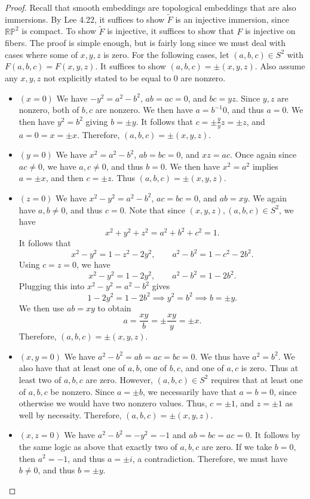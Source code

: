 \documentclass[11pt, letterpaper]{article}
\theoremstyle{plain}
\begin{document}
\begin{proof}
	Recall that smooth embeddings are topological embeddings that are also immersions. By Lee 4.22, it suffices to show $\widetilde{F} $ is an injective immersion, since $\mathbb{R} \mathbb{P} ^2$ is compact. To show $\widetilde{F} $ is injective, it suffices to show that $F$ is injective on fibers. The proof is simple enough, but is fairly long since we must deal with cases where some of $x,y,z$ is zero. For the following cases, let $(a,b,c)\in S^2$ with $F(a,b,c)=F(x,y,z)$. It suffices to show $(a,b,c)=\pm (x,y,z)$. Also assume any $x,y,z$ not explicitly stated to be equal to 0 are nonzero.
	\begin{itemize}
		\item $(x=0)$ We have $-y^2=a^2-b^2$, $ab=ac=0$, and $bc=yz$. Since $y,z$ are nonzero, both of $b,c$ are nonzero. We then have $a=b^{-1} 0$, and thus $a=0$. We then have $y^2=b^2$ giving $b=\pm y$. It follows that $c=\pm\frac{y}{y} z=\pm z$, and $a=0=x=\pm x$. Therefore, $(a,b,c)=\pm(x,y,z)$.
		\item $(y=0)$ We have $x^2=a^2-b^2$, $ab=bc=0$, and $xz=ac$. Once again since $ac\neq 0$, we have $a,c\neq 0$, and thus $b=0$. We then have $x^2=a^2$ implies $a=\pm x$, and then $c=\pm z$. Thus $(a,b,c)=\pm(x,y,z)$.
		\item $(z=0)$ We have $x^2-y^2=a^2-b^2$, $ac=bc=0$, and $ab=xy$. We again have $a,b\neq 0$, and thus $c=0$. Note that since $(x,y,z),(a,b,c)\in S^2$, we have
			\[
				x^2+y^2+z^2=a^2+b^2+c^2=1
			.\]
			It follows that
			\[
				x^2-y^2=1-z^2-2y^2,\qquad a^2-b^2=1-c^2-2b^2
			.\]
			Using $c=z=0$, we have
			\[
				x^2-y^2=1-2y^2,\qquad a^2-b^2=1-2b^2
			.\]
			Plugging this into $x^2-y^2=a^2-b^2$ gives
			\[
				1-2y^2=1-2b^2 \implies y^2=b^2 \implies b=\pm y
			.\]
			We then use $ab=xy$ to obtain
			\[
				a=\frac{xy}{b} =\pm \frac{xy}{y} =\pm x
			.\]
			Therefore, $(a,b,c)=\pm(x,y,z)$.
		\item $(x,y=0)$ We have $a^2-b^2=ab=ac=bc=0$. We thus have $a^2=b^2$. We also have that at least one of $a,b$, one of $b,c$, and one of $a,c$ is zero. Thus at least two of $a,b,c$ are zero. However, $(a,b,c)\in S^2$ requires that at least one of $a,b,c$ be nonzero. Since $a=\pm b$, we necessarily have that $a=b=0$, since otherwise we would have two nonzero values. Thus, $c=\pm1$, and $z=\pm1$ as well by necessity. Therefore, $(a,b,c)=\pm(x,y,z)$.
		\item $(x,z=0)$ We have $a^2-b^2=-y^2=-1$ and $ab=bc=ac=0$. It follows by the same logic as above that exactly two of $a,b,c$ are zero. If we take $b=0$, then $a^2=-1$, and thus $a=\pm i$, a contradiction. Therefore, we must have $b\neq 0$, and thus $b=\pm y$.

\end{itemize}
\end{proof}
\end{document}
